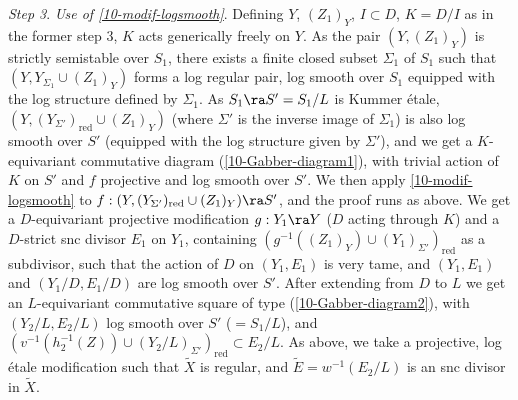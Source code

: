\documentclass[10pt]{../fichiers-configuration-latex/smfart}
\begin{document}
\medskip \textit{Step 3}. \textit{Use of \ref{10-modif-logsmooth}}. Defining
$Y$, $(Z_1)_Y$, $I \subset D$, $K = D/I$ as in the former step 3, $K$ acts
generically freely on $Y$. As the pair $(Y,(Z_1)_Y)$ is strictly semistable
over $S_1$, there exists a finite closed subset $\Sigma_1$ of $S_1$ such that
$(Y, Y_{\Sigma_1} \cup (Z_1)_Y)$ forms a log regular pair, log smooth over
$S_1$ equipped with the log structure defined by $\Sigma_1$. As $S_1 \ra S'
= S_1/L$ is Kummer étale, $(Y,(Y_{\Sigma'})_{\mathrm{red}} \cup (Z_1)_Y)$
(where $\Sigma'$ is the inverse image of $\Sigma_1$) is also log smooth
over $S'$ (equipped with the log structure given by $\Sigma'$), and we get a
$K$-equivariant commutative diagram (\ref{10-Gabber-diagram1}), with trivial
action of $K$ on $S'$ and $f$ projective and log smooth over $S'$. We then
apply \ref{10-modif-logsmooth} to $f : (Y,(Y_{\Sigma'})_{\mathrm{red}} \cup
(Z_1)_Y) \ra S'$, and the proof runs as above. We get a $D$-equivariant
projective modification $g : Y_1 \ra Y$ ($D$ acting through $K$) and a
$D$-strict snc divisor $E_1$ on $Y_1$, containing $(g^{-1}((Z_1)_Y) \cup
(Y_1)_{\Sigma'})_{\mathrm{red}}$ as a subdivisor, such that the action
of $D$ on $(Y_1,E_1)$ is very tame, and $(Y_1,E_1)$ and $(Y_1/D,E_1/D)$
are log smooth over $S'$. After extending from $D$ to $L$ we get an
$L$-equivariant commutative square of type (\ref{10-Gabber-diagram2}), with
$(Y_2/L,E_2/L)$ log smooth over $S'$ ($= S_1/L$), and $(v^{-1}(h_2^{-1}(Z))
\cup (Y_2/L)_{\Sigma'})_{\mathrm{red}} \subset E_2/L$. As above, we take
a projective, log étale modification such that $\tilde X$ is regular,
and $\tilde E = w^{-1}(E_2/L)$ is an snc divisor in $\tilde X$.
\end{document}
